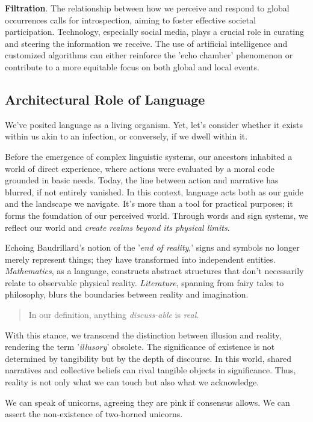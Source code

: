 \documentclass[11pt,a4]{article}
\begin{document}
    \textbf{Filtration}. The relationship between how we perceive and respond to
    global occurrences calls for introspection, aiming to foster effective
    societal participation.   Technology, especially social media, plays a
    crucial role in curating and steering the information we receive. The
    use of artificial intelligence and customized algorithms can either
    reinforce the 'echo chamber' phenomenon or contribute to a more equitable
    focus on both global and local events.

\subsection{Architectural Role of Language}
    We've posited language as a living organism. Yet, let's consider whether it exists within us akin to an infection, or conversely, if we dwell within it.
    \par
    Before the emergence of complex linguistic systems, our ancestors inhabited a world of direct experience, where actions were evaluated by a moral code grounded in basic needs. Today, the line between action and narrative has blurred, if not entirely vanished. In this context, language acts both as our guide and the landscape we navigate. It's more than a tool for practical purposes; it forms the foundation of our perceived world. Through words and sign systems, we reflect our world and \textit{create realms beyond its physical limits}.

    \par
    Echoing Baudrillard's notion of the '\textit{end of reality},' signs and symbols no longer merely represent things; they have transformed into independent entities.
    \textit{Mathematics}, as a language, constructs abstract structures that don't necessarily relate to observable physical reality. \textit{Literature}, spanning from fairy
    tales to philosophy, blurs the boundaries between reality and imagination.

    \par
    \begin{quote}
        In our definition, anything \textit{discuss-able} is \textit{real}.
    \end{quote}


    With this stance, we transcend the distinction between illusion and reality, rendering the term '\textit{illusory}' obsolete. The significance of existence is not determined by tangibility but by the depth of discourse. In this world, shared narratives and collective beliefs can rival tangible objects in significance. Thus, reality is not only what we can touch but also what we acknowledge.
    \par
    We can speak of unicorns, agreeing they are pink if consensus allows. We can assert the non-existence of two-horned unicorns.
\end{document}
